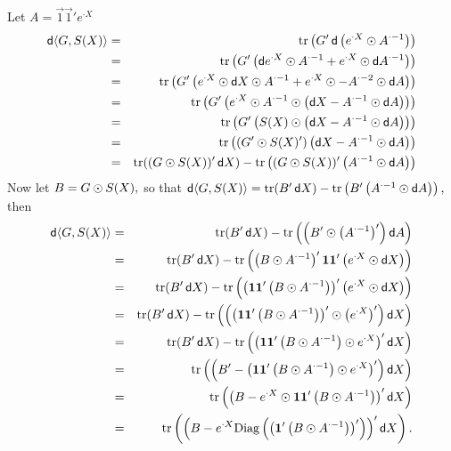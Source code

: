 \documentclass{sapthesis}
\begin{document}
Let \(A = \vec 1 \vec 1' e^{{\cdot}X}\)
\begin{eqnarray*}
\dif\langle G,S(X)\rangle
&=& \trace\left(G' \dif \left(e^{{\cdot}X} \hadam A^{{\cdot}-1}\right)\right)\\
&=& \trace\left(G' \left(
    \dif e^{{\cdot}X} \hadam A^{{\cdot}-1}
    + e^{{\cdot}X} \hadam \dif A^{{\cdot}-1}\right)\right)\\
&=& \trace\left(G' \left(
    e^{{\cdot}X} \hadam \dif X \hadam A^{{\cdot}-1}
    + e^{{\cdot}X} \hadam -A^{{\cdot}-2} \hadam \dif A\right)\right)\\
&=& \trace\left(G' \left(e^{{\cdot}X} \hadam A^{{\cdot}-1}
    \hadam \left(\dif X - A^{{\cdot}-1} \hadam \dif A\right)\right)\right)\\
&=& \trace\left(G'
    \left(S(X) \hadam \left(\dif X - A^{{\cdot}-1} \hadam \dif A\right)\right)\right)\\
&=& \trace\left((G' \hadam S(X)')
    \left(\dif X - A^{{\cdot}-1} \hadam \dif A\right)\right)\\
&=& \trace((G \hadam S(X))' \dif X)
    - \trace\left((G \hadam S(X))' \left(A^{{\cdot}-1} \hadam \dif A\right)\right)
\end{eqnarray*}
Now let \(B = G \odot S(X),\) so that \(\mathop{}\!\mathsf d\langle G,S(X)\rangle = \mathrm{tr}(B' \mathop{}\!\mathsf d X) - \mathrm{tr}\left(B' \left(A^{{\cdot}-1} \odot \mathop{}\!\mathsf d A\right)\right),\) then
\begin{eqnarray*}
\dif\langle G,S(X)\rangle
&=& \trace(B' \dif X) - \trace\left(\left(B' \hadam \left(A^{{\cdot}-1}\right)'\right) \dif A\right)\\
&=& \trace(B' \dif X) - \trace\left(
    \left(B \hadam A^{{\cdot}-1}\right)' \vec 1 \vec 1'
    \left(e^{{\cdot}X} \hadam \dif X\right)
    \right)\\
&=& \trace(B' \dif X)
    - \trace\left(\left(\vec 1 \vec 1' \left(B \hadam A^{{\cdot}-1}\right)\right)'
    \left(e^{{\cdot}X} \hadam \dif X\right)\right)\\
&=& \trace(B' \dif X)
    - \trace\left(\left(\left(\vec 1 \vec 1' \left(B \hadam A^{{\cdot}-1}\right)\right)' \hadam \left(e^{{\cdot}X}\right)'\right)
    \dif X\right)\\
&=& \trace(B' \dif X)
    - \trace\left(\left(\vec 1 \vec 1' \left(B \hadam A^{{\cdot}-1}\right) \hadam e^{{\cdot}X}\right)'
    \dif X\right)\\
&=& \trace\left(
    \left(
    B' - \left(\vec 1 \vec 1' \left(B \hadam A^{{\cdot}-1}\right) \hadam e^{{\cdot}X}\right)'
    \right)\dif X\right)\\
&=& \trace\left(
    \left(
    B - e^{{\cdot}X} \hadam \vec 1 \vec 1' \left(B \hadam A^{{\cdot}-1}\right)
    \right)' \dif X\right)\\
&=& \trace\left(
    \left(
    B - e^{{\cdot}X} \Diag\left(\left(\vec 1' \left(B \hadam A^{{\cdot}-1}\right)\right)'\right)
    \right)' \dif X\right).
\end{eqnarray*}
\end{document}
